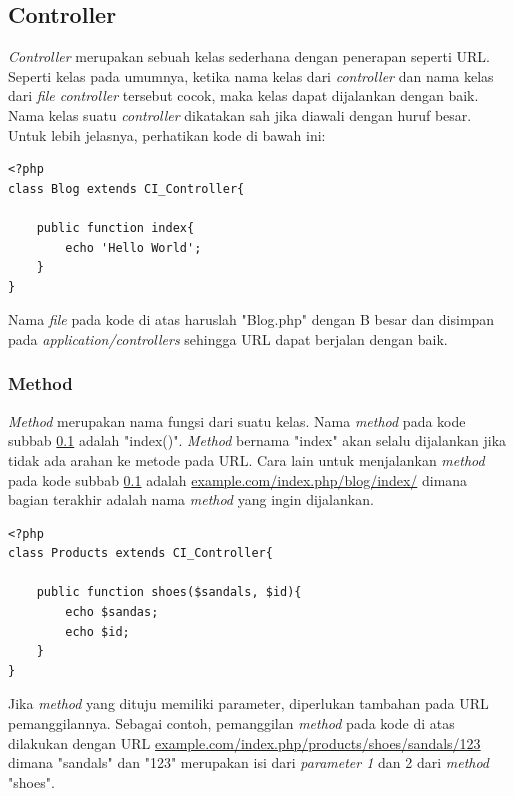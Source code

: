 \subsection{Controller}
\label{sub: controller}

	\textit{Controller} merupakan sebuah kelas sederhana dengan penerapan seperti URL. Seperti kelas pada umumnya, ketika nama kelas dari \textit{controller} dan nama kelas dari \textit{file controller} tersebut cocok, maka kelas dapat dijalankan dengan baik. Nama kelas suatu \textit{controller} dikatakan sah jika diawali dengan huruf besar. Untuk lebih jelasnya, perhatikan kode di bawah ini:
	
\begin{lstlisting}
<?php
class Blog extends CI_Controller{
	
	public function index{
		echo 'Hello World';
	}
}
\end{lstlisting}

	Nama \textit{file} pada kode di atas haruslah  "Blog.php" dengan B besar dan disimpan pada \textit{application/controllers} sehingga URL dapat berjalan dengan baik.
	
\subsubsection{Method}
\label{subsub: method}

	\textit{Method} merupakan nama fungsi dari suatu kelas. Nama \textit{method} pada kode subbab \ref{sub: controller} adalah "index()". \textit{Method} bernama "index" akan selalu dijalankan jika tidak ada arahan ke metode pada URL. Cara lain untuk menjalankan \textit{method} pada kode subbab \ref{sub: controller} adalah \url{example.com/index.php/blog/index/} dimana bagian terakhir adalah nama \textit{method} yang ingin dijalankan.
	
	
	\begin{lstlisting}
<?php
class Products extends CI_Controller{

	public function shoes($sandals, $id){
		echo $sandas;
		echo $id;
	}
}
	\end{lstlisting}
	
	Jika \textit{method} yang dituju memiliki parameter, diperlukan tambahan pada URL pemanggilannya. Sebagai contoh, pemanggilan \textit{method}	pada kode di atas dilakukan dengan URL \url{example.com/index.php/products/shoes/sandals/123} dimana "sandals" dan "123" merupakan isi dari \textit{parameter 1} dan 2 dari \textit{method} "shoes".
	

